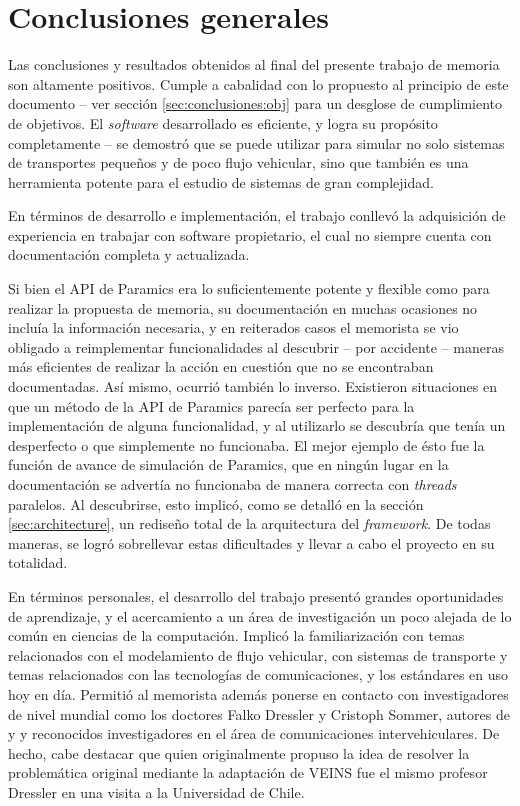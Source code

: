\section{Conclusiones generales}

Las conclusiones y resultados obtenidos al final del presente trabajo de memoria son altamente positivos. Cumple a cabalidad con lo propuesto al principio de este documento -- ver sección \ref{sec:conclusiones:obj} para un desglose de cumplimiento de objetivos. El \emph{software} desarrollado es eficiente, y logra su propósito completamente -- se demostró que se puede utilizar para simular no solo sistemas de transportes pequeños y de poco flujo vehicular, sino que también es una herramienta potente para el estudio de sistemas de gran complejidad.

En términos de desarrollo e implementación, el trabajo conllevó la adquisición de experiencia en trabajar con software propietario, el cual no siempre cuenta con documentación completa y actualizada. 

Si bien el API de Paramics era lo suficientemente potente y flexible como para realizar la propuesta de memoria, su documentación en muchas ocasiones no incluía la información necesaria, y en reiterados casos el memorista se vio obligado a reimplementar funcionalidades al descubrir -- por accidente -- maneras más eficientes de realizar la acción en cuestión que no se encontraban documentadas. 
Así mismo, ocurrió también lo inverso. Existieron situaciones en que un método de la API de Paramics parecía ser perfecto para la implementación de alguna funcionalidad, y al utilizarlo se descubría que tenía un desperfecto o que simplemente no funcionaba. El mejor ejemplo de ésto fue la función de avance de simulación de Paramics, que en ningún lugar en la documentación se advertía no funcionaba de manera correcta con \emph{threads} paralelos. Al descubrirse, esto implicó, como se detalló en la sección \ref{sec:architecture}, un rediseño total de la arquitectura del \emph{framework}. De todas maneras, se logró sobrellevar estas dificultades y llevar a cabo el proyecto en su totalidad.

En términos personales, el desarrollo del trabajo presentó grandes oportunidades de aprendizaje, y el acercamiento a un área de investigación un poco alejada de lo común en ciencias de la computación. Implicó la familiarización con temas relacionados con el modelamiento de flujo vehicular, con sistemas de transporte y temas relacionados con las tecnologías de comunicaciones, y los estándares en uso hoy en día. Permitió al memorista además ponerse en contacto con investigadores de nivel mundial como los doctores Falko Dressler y Cristoph Sommer, autores de \autocite{sommer_german_dressler} y \autocite{sommer_dressler2} y reconocidos investigadores en el área de comunicaciones intervehiculares. De hecho, cabe destacar que quien originalmente propuso la idea de resolver la problemática original mediante la adaptación de VEINS fue el mismo profesor Dressler en una visita a la Universidad de Chile.

